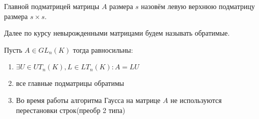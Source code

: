 \begin{definition}
    Главной подматрицей матрицы $A$ размера $s$ назовём левую верхнюю подматрицу
    размера $s\times s$.
\end{definition}
\begin{remark}
    Далее по курсу невырожденными матрицами будем называть обратимые.
\end{remark}
\begin{theorem}
    Пусть $A\in GL_n(K)$ тогда равносильны:
    \begin{enumerate}
        \item $\exists U\in UT_n(K), L\in LT_n(K)\colon A = LU$
        \item все главные подматрицы обратимы
        \item Во время работы алгоритма Гаусса на матрице $A$ не используются перестановки строк(преобр 2 типа) 
    \end{enumerate}
\end{theorem}

